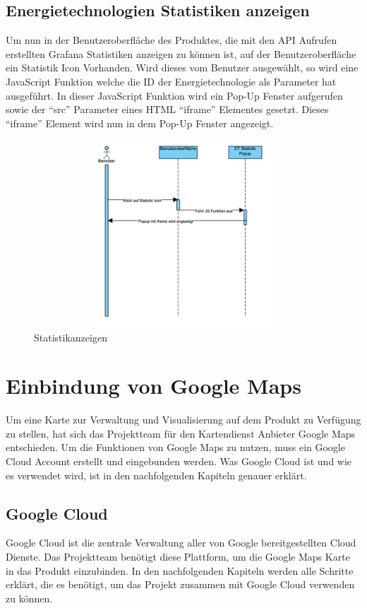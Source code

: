 \subsection{Energietechnologien Statistiken anzeigen}
Um nun in der Benutzeroberfläche des Produktes, die mit den API Aufrufen erstellten Grafana Statistiken anzeigen zu können ist, auf der Benutzeroberfläche ein Statistik Icon Vorhanden. Wird dieses vom Benutzer ausgewählt, so wird eine JavaScript Funktion welche die ID der Energietechnologie als Parameter hat ausgeführt. In dieser JavaScript Funktion wird ein Pop-Up Fenster aufgerufen sowie der “src” Parameter eines HTML “iframe” Elementes gesetzt. Dieses “iframe” Element wird nun in dem Pop-Up Fenster angezeigt.
\begin{figure}[h]
	\centering
	\includegraphics[height=7cm,width=14cm]{images/Statistikanzeigen}
	\caption{Statistikanzeigen}
	\label{fig:Statistikanzeigen }
\end{figure} 



\section{Einbindung von Google Maps}
Um eine Karte zur Verwaltung und Visualisierung auf dem Produkt zu Verfügung zu stellen, hat sich das Projektteam für den Kartendienst Anbieter Google Maps entschieden. Um die Funktionen von Google Maps zu nutzen, muss ein Google Cloud Account erstellt und eingebunden werden. Was Google Cloud ist und wie es verwendet wird, ist in den nachfolgenden Kapiteln genauer erklärt.

\subsection{Google Cloud} \label{sec: Google Cloud}
Google Cloud ist die zentrale Verwaltung aller von Google bereitgestellten Cloud Dienste. Das Projektteam benötigt diese Plattform, um die Google Maps Karte in das Produkt einzubinden. In den nachfolgenden Kapiteln werden alle Schritte erklärt, die es benötigt, um das Projekt zusammen mit Google Cloud verwenden zu können.


